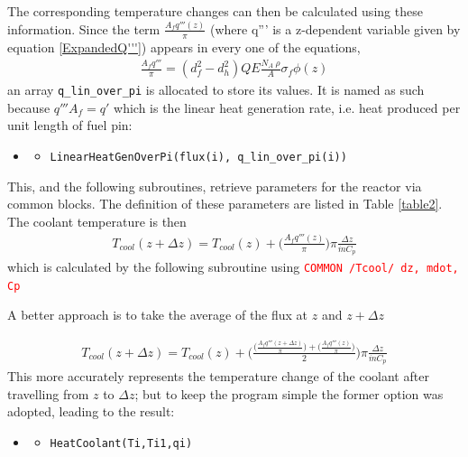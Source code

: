 \documentclass[a4paper, 12pt]{article}
\begin{document}
The corresponding temperature changes can then be calculated using these information.
Since the term $\frac{A_f q'''(z)}{\pi}$ (where q''' is a z-dependent variable given by equation \ref{ExpandedQ'''}) appears in every one of the equations,
\begin{align}
\frac{A_f q'''}{\pi} = (d_f^2-d_h^2) Q E \frac{N_A \:\rho}{A} \sigma_f \phi(z) \label{Afq'''pi}
\end{align}
an array \texttt{q\_lin\_over\_pi} is allocated to store its values. It is named as such because $q''' A_f = q'$ which is the linear heat generation rate, i.e. heat produced per unit length of fuel pin:
\begin{itemize}
	\item[]
	\begin{itemize}
	\item \texttt{\textcolor{subr}{LinearHeatGenOverPi}(flux(i), q\_lin\_over\_pi(i))}
	\end  {itemize}
\end  {itemize}
This, and the following subroutines, retrieve parameters for the reactor via common blocks. The definition of these parameters are listed in Table \ref{table2}.\\

The coolant temperature is then 
\begin{align}\label{Tcool}
T_{cool}(z+\Delta z)= T_{cool}(z)+ \bigg(\frac{A_f q'''(z)}{\pi}\bigg) \pi \frac{\Delta z}{\dot{m}C_p}
\end{align}
which is calculated by the following subroutine using \texttt{\textcolor{red}{COMMON /Tcool/ dz, mdot, Cp}}

A better approach is to take the average of the flux at $z$ and $z+\Delta z$
	
\begin{align}
T_{cool}(z+\Delta z)= T_{cool}(z)+ \bigg(\frac{\big(\frac{A_f q'''(z+\Delta z)}{\pi}\big)+\big(\frac{A_f q'''(z)}{\pi}\big)}{2}\bigg) \pi \frac{\Delta z}{\dot{m}C_p}
\label{LinearInterp}
\end{align}
This more accurately represents the temperature change of the coolant after travelling from $z$ to $\Delta z$; but to keep the program simple the former option was adopted, leading to the result:

\begin{itemize}
	\item[]
	\begin{itemize}
	\item \texttt{\textcolor{subr}{HeatCoolant}(Ti,Ti1,qi)}
	\end{itemize}
\end{itemize}
\end{document}
